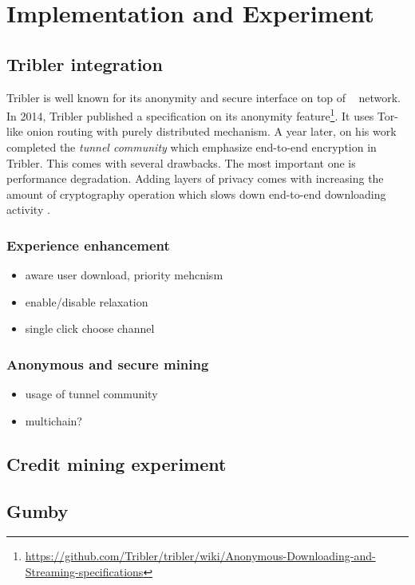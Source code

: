 \chapter{Implementation and Experiment}
\label{chp:implexperiment}

\section{Tribler integration}
Tribler is well known for its anonymity and secure interface on top of \bt~ network. In 2014, Tribler published a specification on its anonymity feature\footnote{\url{https://github.com/Tribler/tribler/wiki/Anonymous-Downloading-and-Streaming-specifications}}. It uses Tor-like onion routing with purely distributed mechanism. A year later, \citeauthor{2015:tunnel:ruigrok} on his work completed the \textit{tunnel community} which emphasize end-to-end encryption in Tribler. This comes with several drawbacks. The most important one is performance degradation. Adding layers of privacy comes with increasing the amount of cryptography operation which slows down end-to-end downloading activity \cite{2015:tunnel:ruigrok}.

\subsection{Experience enhancement}
\begin{itemize}
	\item  aware user download, priority mehcnism
	\item  enable/disable relaxation
	\item single click choose channel
\end{itemize}

\subsection{Anonymous and secure mining}
\begin{itemize}
	\item  usage of tunnel community
	\item  multichain?
\end{itemize}

\section{Credit mining experiment}

\section{Gumby}

